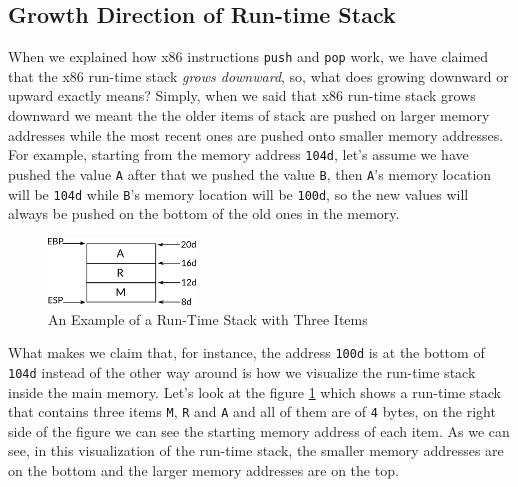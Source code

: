 \subsection{Growth Direction of Run-time
Stack}\label{growth-direction-of-run-time-stack}

When we explained how x86 instructions \lstinline!push! and
\lstinline!pop! work, we have claimed that the x86 run-time stack
\emph{grows downward}, so, what does growing downward or upward exactly
means? Simply, when we said that x86 run-time stack grows downward we
meant the the older items of stack are pushed on larger memory addresses
while the most recent ones are pushed onto smaller memory addresses. For
example, starting from the memory address \lstinline!104d!, let's assume
we have pushed the value \lstinline!A! after that we pushed the value
\lstinline!B!, then \lstinline!A!'s memory location will be
\lstinline!104d! while \lstinline!B!'s memory location will be
\lstinline!100d!, so the new values will always be pushed on the bottom
of the old ones in the memory.

\begin{figure}
\centering
\includegraphics[width=0.35000\textwidth]{Figures/x86-ch/Fig10062021_0.png}
\caption{An Example of a Run-Time Stack with Three
Items}\label{fig:10062021_0}
\end{figure}

What makes we claim that, for instance, the address \lstinline!100d! is
at the bottom of \lstinline!104d! instead of the other way around is how
we visualize the run-time stack inside the main memory. Let's look at
the figure \ref{fig:10062021_0} which shows a run-time stack that
contains three items \lstinline!M!, \lstinline!R! and \lstinline!A! and
all of them are of \lstinline!4! bytes, on the right side of the figure
we can see the starting memory address of each item. As we can see, in
this visualization of the run-time stack, the smaller memory addresses
are on the bottom and the larger memory addresses are on the top.

